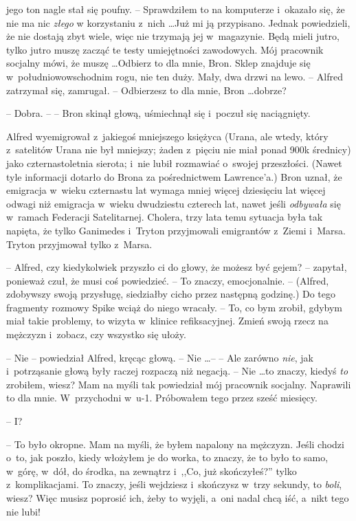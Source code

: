 \documentclass[oneside,polish,11pt,rmheadings]{mwbk}
\begin{document}
jego ton nagle stał się poufny. -- Sprawdziłem to na komputerze i~okazało się, że nie ma nic \textit{złego }w korzystaniu z~nich \ldots   Już mi ją przypisano.  Jednak powiedzieli, że nie dostają zbyt wiele, więc nie trzymają jej w~magazynie. Będą mieli jutro, tylko jutro muszę zacząć te testy umiejętności zawodowych. Mój pracownik socjalny mówi, że muszę \ldots  Odbierz to dla mnie, Bron. Sklep znajduje się w~południowo\dywiz wschodnim rogu, nie ten duży. Mały, dwa drzwi na lewo. -- Alfred zatrzymał się, zamrugał. -- Odbierzesz to dla mnie, Bron \ldots  dobrze?  

-- Dobra. -- -- Bron skinął głową, uśmiechnął się i~poczuł się naciągnięty. 

Alfred wyemigrował z~jakiegoś mniejszego księżyca (Urana, ale wtedy, który z~satelitów Urana nie był mniejszy; żaden z~pięciu nie miał ponad 900k średnicy) jako czternastoletnia sierota; i~nie lubił rozmawiać o~swojej przeszłości. (Nawet tyle informacji dotarło do Brona za pośrednictwem Lawrence'a.) Bron uznał, że emigracja w~wieku czternastu lat wymaga mniej więcej dziesięciu lat więcej odwagi niż emigracja w~wieku dwudziestu czterech lat, nawet jeśli \textit{odbywała }się w~ramach Federacji Satelitarnej. Cholera, trzy lata temu sytuacja była tak napięta, że tylko Ganimedes i~Tryton przyjmowali emigrantów z~Ziemi i~Marsa. Tryton przyjmował tylko z~Marsa. 

-- Alfred, czy kiedykolwiek przyszło ci do głowy, że możesz być gejem? -- zapytał, ponieważ czuł, że musi coś powiedzieć.  -- To znaczy, emocjonalnie. -- (Alfred, zdobywszy swoją przysługę, siedziałby cicho przez następną godzinę.) Do tego fragmenty rozmowy Spike wciąż do niego wracały.  -- To, co bym zrobił, gdybym miał takie problemy, to wizyta w~klinice refiksacyjnej. Zmień swoją rzecz na mężczyzn i~zobacz, czy wszystko się ułoży.  

-- Nie -- powiedział Alfred, kręcąc głową. -- Nie \ldots --  -- Ale zarówno \textit{nie}, jak i~potrząsanie głową były raczej rozpaczą niż negacją. -- Nie \ldots   to znaczy, kiedyś \textit{to }zrobiłem, wiesz? Mam na myśli tak powiedział mój pracownik socjalny. Naprawili to dla mnie. W~przychodni w~u-1.  Próbowałem tego przez sześć miesięcy. 

-- I? 

-- To było okropne. Mam na myśli, że byłem napalony na mężczyzn. Jeśli chodzi o~to, jak poszło, kiedy włożyłem je do worka, to znaczy, że to było to samo, w~górę, w~dół, do środka, na zewnątrz i~,,Co, już skończyłeś?'' tylko z~komplikacjami. To znaczy, jeśli wejdziesz i~skończysz w~trzy sekundy, to \textit{boli}, wiesz? Więc musisz poprosić ich, żeby to wyjęli, a~oni nadal chcą iść, a~nikt tego nie lubi! 
\end{document}
